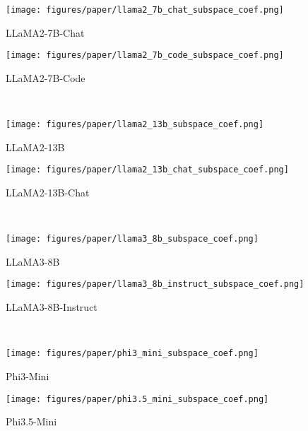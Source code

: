 \begin{figure*}[!t]
    \centering
    \begin{subfigure}[t]{0.47\textwidth}
        \texttt{[image: figures/paper/llama2\_7b\_chat\_subspace\_coef.png]}
        \caption{LLaMA2-7B-Chat}\label{fig:llama2_7b_chat_subspace_coef}
    \end{subfigure}
    \begin{subfigure}[t]{0.47\textwidth}
        \texttt{[image: figures/paper/llama2\_7b\_code\_subspace\_coef.png]}
        \caption{LLaMA2-7B-Code}\label{fig:llama2_7b_code_subspace_coef}
    \end{subfigure}\\
    \begin{subfigure}[t]{0.47\textwidth}
        \texttt{[image: figures/paper/llama2\_13b\_subspace\_coef.png]}
        \caption{LLaMA2-13B}\label{fig:llama2_13b_subspace_coef}
    \end{subfigure}
    \begin{subfigure}[t]{0.47\textwidth}
        \texttt{[image: figures/paper/llama2\_13b\_chat\_subspace\_coef.png]}
        \caption{LLaMA2-13B-Chat}\label{fig:llama2_13b_chat_subspace_coef}
    \end{subfigure}\\
    \begin{subfigure}[t]{0.47\textwidth}
        \texttt{[image: figures/paper/llama3\_8b\_subspace\_coef.png]}
        \caption{LLaMA3-8B}\label{fig:llama3_8b_subspace_coef}
    \end{subfigure}
    \begin{subfigure}[t]{0.47\textwidth}
        \texttt{[image: figures/paper/llama3\_8b\_instruct\_subspace\_coef.png]}
        \caption{LLaMA3-8B-Instruct}\label{fig:llama3_8b_instruct_subspace_coef}
    \end{subfigure}\\
    \begin{subfigure}[t]{0.47\textwidth}
        \texttt{[image: figures/paper/phi3\_mini\_subspace\_coef.png]}
        \caption{Phi3-Mini}\label{fig:phi3_mini_subspace_coef}
    \end{subfigure}
    \begin{subfigure}[t]{0.47\textwidth}
        \texttt{[image: figures/paper/phi3.5\_mini\_subspace\_coef.png]}
        \caption{Phi3.5-Mini}\label{fig:phi3.5_mini_subspace_coef}
    \end{subfigure}\\

\end{figure*}
